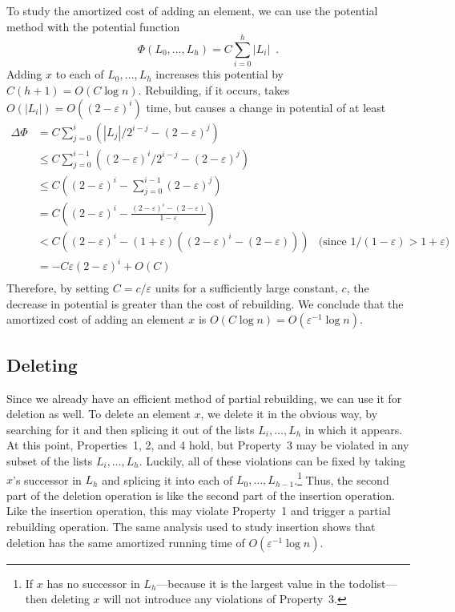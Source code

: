 \documentclass[lotsofwhite]{patmorin}
\newcommand{\eps}{\varepsilon}
\begin{document}
To study the amortized cost of adding an element, we
can use the potential method with the potential function
\[
    \Phi(L_0,\ldots,L_h)=C\sum_{i=0}^h|L_i| \enspace .
\]
Adding $x$ to each of $L_0,\ldots,L_h$ increases this potential by
$C(h+1)=O(C\log n)$.  Rebuilding, if it occurs, takes $O(|L_i|)=O((2-\eps)^i)$
time, but causes a change in potential of at least
\begin{align*}
     \Delta\Phi & = C\sum_{j=0}^i\left(|L_j|/2^{i-j} - (2-\eps)^j\right) \\
          & \le C\sum_{j=0}^{i-1}\left((2-\eps)^i/2^{i-j} - (2-\eps)^j\right) \\
          & \le C\left((2-\eps)^i - \sum_{j=0}^{i-1}(2-\eps)^j\right) \\
          & = C\left((2-\eps)^i - \frac{(2-\eps)^i-(2-\eps)}{1-\eps}\right) \\
          & < C\left((2-\eps)^i - (1+\eps)\left((2-\eps)^i-(2-\eps)\right)\right)
           & \text{(since $1/(1-\eps)>1+\eps$)} \\
          & = -C\eps(2-\eps)^i + O(C) \\
\end{align*}
Therefore, by setting $C=c/\eps$ units for a sufficiently large constant,
$c$, the decrease in potential is greater than the cost of rebuilding.
We conclude that the amortized cost of adding an element $x$ is $O(C\log
n)=O(\eps^{-1}\log n)$.

\subsection{Deleting}

Since we already have an efficient method of partial rebuilding, we
can use it for deletion as well. To delete an element $x$, we delete
it in the obvious way, by searching for it and then splicing it out
of the lists $L_i,\ldots,L_h$ in which it appears.  At this point,
Properties~1, 2, and 4 hold, but Property~3 may be violated in any
subset of the lists $L_i,\ldots,L_h$.  Luckily, all of these violations
can be fixed by taking $x$'s successor in $L_h$ and splicing it into
each of $L_0,\ldots,L_{h-1}$.\footnote{If $x$ has no successor in
$L_h$---because it is the largest value in the todolist---then deleting
$x$ will not introduce any violations of Property~3.}  Thus, the second
part of the deletion operation is like the second part of the insertion
operation.  Like the insertion operation, this may violate Property~1
and trigger a partial rebuilding operation.  The same analysis used to
study insertion shows that deletion has the same amortized running time
of $O(\eps^{-1}\log n)$.
\end{document}
